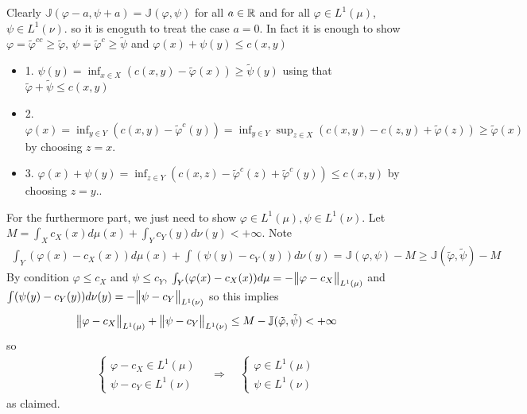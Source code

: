 \documentclass[12pt,a4paper]{article}
\newenvironment{proof}
{\begin{changemargin}{1cm}{0.5cm} 
	}%
	{\end{changemargin}
}
\renewenvironment{i}
{\begin{itemize} 
	}%
	{\end{itemize}
}
\newenvironment{p}
{\begin{proof} 
	}%
	{\end{proof}
}
\begin{document}
\begin{p}
\pf Clearly $\mathbb{J}(\varphi -a, \psi +a) = \mathbb{J}(\varphi, \psi)$ for all $a\in \mathbb{R}$ and for all $\varphi\in L^1(\mu)$, $\psi \in L^1(\nu)$. so it is enoguth to treat the case $a=0$. In fact it is enough to show $\varphi = \tilde{\varphi}^{cc} \geq \tilde{\varphi}$, $\psi = \tilde{\varphi}^c \geq \tilde{\psi}$ and $\varphi(x) + \psi(y) \leq c(x,y)$ 
\begin{i}
\item[1.] $\psi(y) = \inf_{x\in X} (c(x,y)- \tilde{\varphi}(x)) \geq \tilde{\psi}(y)$ using that $\tilde{\varphi} + \tilde{\psi} \leq c(x,y)$
\item[2.] $\varphi(x) = \inf_{y \in Y}(c(x,y) - \tilde{\varphi}^c (y)) = \inf_{y\in Y}\sup_{z\in X}(c(x,y) - c(z,y) + \tilde{\varphi}(z)) \geq \tilde{\varphi}(x)$ by choosing $z=x$.
\item[3.] $\varphi(x) + \psi(y) = \inf_{z\in Y}(c(x,z) - \tilde{\varphi}^c(z) + \tilde{\varphi}^c (y)) \leq c(x,y)$ by choosing $z=y.$.
\end{i}
\s

For the furthermore part, we just need to show $\varphi \in L^1(\mu), \psi\in L^1(\nu)$. Let $M = \int_X c_X(x) d\mu(x)+ \int_Y c_Y(y)d\nu(y) < + \infty$. Note
\begin{align*}
\int_Y (\varphi(x) - c_X(x))d\mu(x) + \int (\psi(y)- c_Y(y)) d\nu(y) = \mathbb{J}(\varphi, \psi) -M \geq \mathbb{J}(\tilde{\varphi}, \tilde{\psi}) - M
\end{align*}
By condition $\varphi \leq c_X$ and $\psi \leq c_Y$, $\int_Y (\varphi(x)- c_X(x))d\mu = - \bigl\lVert\varphi - c_X\bigr\rVert_{L^1(\mu)}$ and $\int (\psi(y)- c_Y(y)) d\nu(y) = -\bigl\lVert\psi - c_Y\bigr\rVert_{L^1(\nu)}$  so this implies
\begin{align*}
\bigl\lVert\varphi - c_X\bigr\rVert_{L^1(\mu)} + \bigl\lVert\psi - c_Y\bigr\rVert_{L^1(\nu)}\leq M - \mathbb{J}(\tilde{\varphi}, \tilde{\psi}) < +\infty
\end{align*}
so
\begin{align*}
\begin{cases}
\varphi - c_X \in L^1(\mu) \\
\psi - c_Y \in L^1(\nu) 
\end{cases} \quad \Rightarrow \quad \begin{cases}
\varphi  \in L^1(\mu) \\
\psi  \in L^1(\nu) 
\end{cases}
\end{align*}
as claimed.

\eop
\end{p}
\s
\end{document}
